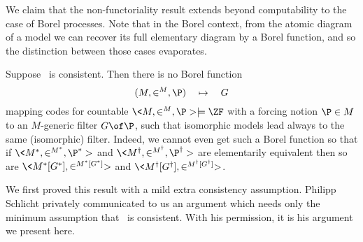 \documentclass{amsart}
\begin{document}
We claim that the non-functoriality result extends beyond computability to the case of Borel processes. Note that in the Borel context, from the atomic diagram of a model we can recover its full elementary diagram by a Borel function, and so the distinction between those cases evaporates.

\begin{theorem}\label{thm:Borel}
Suppose \ZF\ is consistent. Then there is no Borel function
  $$(M,\in^M,\P)\quad\mapsto\quad G$$
 mapping codes for countable $\<M,\in^M,\P> \models \ZF$ with a forcing notion $\P\in M$ to an $M$-generic filter $G\of\P$, such that isomorphic models lead always to the same (isomorphic) filter. Indeed, we cannot even get such a Borel function so that if $\<M^*,\in^{M^*},\P^*>$ and $\<M^\dagger,\in^{M^\dagger},\P^\dagger>$ are elementarily equivalent then so are $\<M^*[G^*],\in^{M^*[G^*]}>$ and $\<M^\dagger[G^\dagger],\in^{M^\dagger[G^\dagger]}>$.
\end{theorem}

We first proved this result with a mild extra consistency assumption. Philipp Schlicht privately communicated to us an argument which needs only the minimum assumption that \ZF\ is consistent. With his permission, it is his argument we present here.
\end{document}
